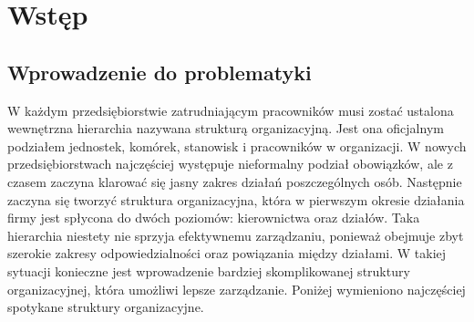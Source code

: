 
\chapter{Wstęp}
\label{ch:wstep}

\section{Wprowadzenie do problematyki}

W każdym przedsiębiorstwie zatrudniającym pracowników musi zostać ustalona wewnętrzna hierarchia nazywana strukturą organizacyjną. Jest ona oficjalnym podziałem jednostek, komórek, stanowisk i pracowników w organizacji. W nowych przedsiębiorstwach najczęściej występuje nieformalny podział obowiązków, ale z czasem zaczyna klarować się jasny zakres działań poszczególnych osób. Następnie zaczyna się tworzyć struktura organizacyjna, która w pierwszym okresie działania firmy jest spłycona do dwóch poziomów: kierownictwa oraz działów. Taka hierarchia niestety nie sprzyja efektywnemu zarządzaniu, ponieważ obejmuje zbyt szerokie zakresy odpowiedzialności oraz powiązania między działami. \cite{bib:zarzadzanie} W takiej sytuacji konieczne jest wprowadzenie bardziej skomplikowanej struktury organizacyjnej, która umożliwi lepsze zarządzanie. Poniżej wymieniono najczęściej spotykane struktury organizacyjne. \cite{bib:StrukturaOrganizacyjna}

